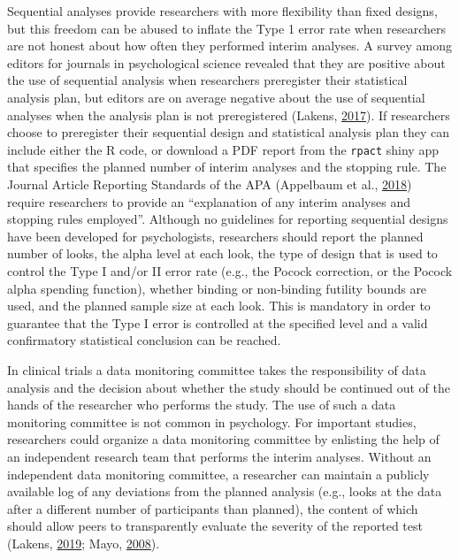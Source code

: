 \documentclass[
  english,
  ,jou, a4paper,floatsintext]{apa6}
\begin{document}
Sequential analyses provide researchers with more flexibility than fixed designs, but this freedom can be abused to inflate the Type 1 error rate when researchers are not honest about how often they performed interim analyses. A survey among editors for journals in psychological science revealed that they are positive about the use of sequential analysis when researchers preregister their statistical analysis plan, but editors are on average negative about the use of sequential analyses when the analysis plan is not preregistered (Lakens, \protect\hyperlink{ref-lakens_will_2017}{2017}). If researchers choose to preregister their sequential design and statistical analysis plan they can include either the R code, or download a PDF report from the \texttt{rpact} shiny app that specifies the planned number of interim analyses and the stopping rule. The Journal Article Reporting Standards of the APA (Appelbaum et al., \protect\hyperlink{ref-appelbaum_journal_2018}{2018}) require researchers to provide an ``explanation of any interim analyses and stopping rules employed''. Although no guidelines for reporting sequential designs have been developed for psychologists, researchers should report the planned number of looks, the alpha level at each look, the type of design that is used to control the Type I and/or II error rate (e.g., the Pocock correction, or the Pocock alpha spending function), whether binding or non-binding futility bounds are used, and the planned sample size at each look. This is mandatory in order to guarantee that the Type I error is controlled at the specified level and a valid confirmatory statistical conclusion can be reached.

In clinical trials a data monitoring committee takes the responsibility of data analysis and the decision about whether the study should be continued out of the hands of the researcher who performs the study. The use of such a data monitoring committee is not common in psychology. For important studies, researchers could organize a data monitoring committee by enlisting the help of an independent research team that performs the interim analyses. Without an independent data monitoring committee, a researcher can maintain a publicly available log of any deviations from the planned analysis (e.g., looks at the data after a different number of participants than planned), the content of which should allow peers to transparently evaluate the severity of the reported test (Lakens, \protect\hyperlink{ref-lakens_value_2019}{2019}; Mayo, \protect\hyperlink{ref-mayo_how_2008}{2008}).
\end{document}
